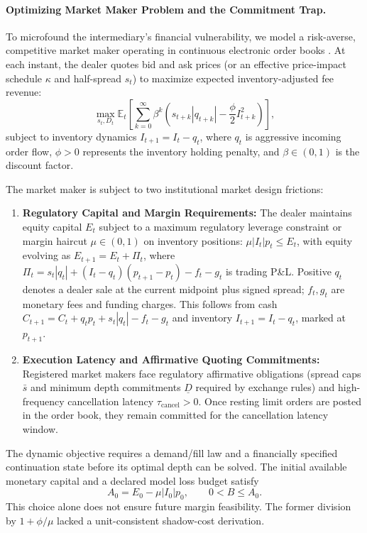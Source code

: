 \documentclass[12pt]{article}
\theoremstyle{definition}
\theoremstyle{remark}
\begin{document}
\paragraph{Optimizing Market Maker Problem and the Commitment Trap.}
To microfound the intermediary's financial vulnerability, we model a risk-averse, competitive market maker operating in continuous electronic order books \citep{ho1981optimal,grossman1988liquidity,avellaneda2008high,menkveld2013}. At each instant, the dealer quotes bid and ask prices (or an effective price-impact schedule $\kappa$ and half-spread $s_t$) to maximize expected inventory-adjusted fee revenue:
\begin{equation}
\max_{s_t, D_t} \mathbb{E}_t \left[ \sum_{k=0}^\infty \beta^k \left( s_{t+k} |q_{t+k}| - \frac{\phi}{2} I_{t+k}^2 \right) \right],
\label{eq:dealer_optimization}
\end{equation}
subject to inventory dynamics $I_{t+1} = I_t - q_t$, where $q_t$ is aggressive incoming order flow, $\phi > 0$ represents the inventory holding penalty, and $\beta \in (0, 1)$ is the discount factor. 

The market maker is subject to two institutional market design frictions:
\begin{enumerate}
    \item \textbf{Regulatory Capital and Margin Requirements:} The dealer maintains equity capital $E_t$ subject to a maximum regulatory leverage constraint or margin haircut $\mu \in (0, 1)$ on inventory positions: $\mu |I_t| p_t \le E_t$, with equity evolving as $E_{t+1} = E_t + \Pi_t$, where $\Pi_t = s_t |q_t| + (I_t-q_t)(p_{t+1}-p_t)-f_t-g_t$ is trading P\&L. Positive $q_t$ denotes a dealer sale at the current midpoint plus signed spread; $f_t,g_t$ are monetary fees and funding charges. This follows from cash $C_{t+1}=C_t+q_tp_t+s_t|q_t|-f_t-g_t$ and inventory $I_{t+1}=I_t-q_t$, marked at $p_{t+1}$.
    \item \textbf{Execution Latency and Affirmative Quoting Commitments:} Registered market makers face regulatory affirmative obligations (spread caps $\bar{s}$ and minimum depth commitments $\underline{D}$ required by exchange rules) and high-frequency cancellation latency $\tau_{\text{cancel}} > 0$. Once resting limit orders are posted in the order book, they remain committed for the cancellation latency window.
\end{enumerate}

The dynamic objective requires a demand/fill law and a financially specified continuation state before its optimal depth can be solved. The initial available monetary capital and a declared model loss budget satisfy
\begin{equation}
A_0=E_0-\mu|I_0|p_0,\qquad 0<B\le A_0.
\label{eq:dealer_buffer}
\end{equation}
This choice alone does not ensure future margin feasibility. The former division by $1+\phi/\mu$ lacked a unit-consistent shadow-cost derivation.
\end{document}
